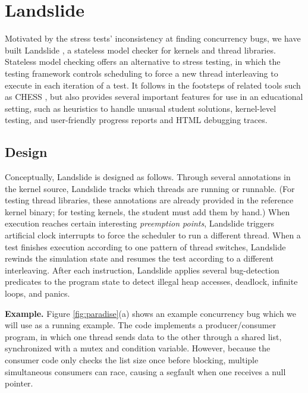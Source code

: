 \section{Landslide}
\label{sec:landslide}

Motivated by the stress tests' inconsistency at finding concurrency bugs,
we have built Landslide%
, a stateless model checker for \pebbles kernels and thread libraries.
Stateless model checking \cite{verisoft} offers an alternative
to stress testing,
in which the testing framework controls scheduling to force a new thread interleaving to execute in each iteration of a test.
It follows in the footsteps of related tools such as CHESS \cite{chess},
but also provides several important features for use in an educational setting,
such as heuristics to handle unusual student solutions, kernel-level testing, and user-friendly progress reports and HTML debugging traces.

\subsection{Design}

Conceptually,
Landslide is designed as follows.
Through several annotations in the kernel source, Landslide tracks
which threads are running or runnable.
(For testing thread libraries, these annotations are already provided in the reference kernel binary;
for testing kernels, the student must add them by hand.)
When execution reaches certain interesting {\em preemption points},
Landslide triggers artificial clock interrupts
to force the scheduler to run a different thread.
When a test finishes execution according
to one pattern of thread switches,
Landslide rewinds the simulation state
and resumes the test according to a different interleaving.
After each instruction,
Landslide applies several bug-detection predicates to
the program state to detect
illegal heap accesses,
deadlock, infinite loops, and panics.

{\bf Example.}
Figure \ref{fig:paradise}(a) shows an example concurrency bug which we will use as a running example.
The code implements a producer/consumer program, in which one thread sends data to the other through a shared list,
synchronized with a mutex and condition variable.
However, because the consumer code only checks the list size once before blocking,
multiple simultaneous consumers can race,
causing a segfault when one receives a null  pointer. %

